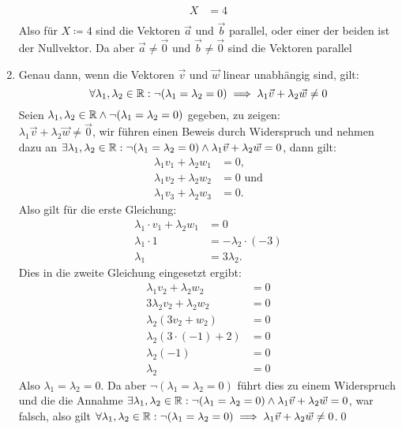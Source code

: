 \documentclass[sectionformat = aufgabe]{gadsescript}
\begin{document}
\begin{enumerate}[label=\alph*)]
\begin{align*}
			X &= 4\\
		\end{align*}
		Also für $ X \coloneqq 4 $ sind die Vektoren $\vec a $ und $ \vec b $ parallel, oder einer der beiden ist der Nullvektor. Da aber $ \vec a \neq \vec0 $ und $ \vec b \neq \vec0 $ sind die Vektoren parallel
	\item Genau dann, wenn die Vektoren $ \vec v $ und $ \vec w $ linear unabhängig sind, gilt:
		\[ \forall \lambda_1,\lambda_2 \in \mathbb{R} : \neg(\lambda_1 = \lambda_2 = 0 ) \implies \lambda_1\vec v + \lambda_2\vec w \neq 0 \]
		Seien $ \lambda_1, \lambda_2 \in \mathbb{R} \wedge \neg(\lambda_1 = \lambda_2 = 0)$ gegeben, zu zeigen:\\
		$\lambda_1 \vec v + \lambda_2 \vec w \neq \vec 0 $, wir führen einen Beweis durch Widerspruch und nehmen dazu an $ \exists\lambda_1,\lambda_2\in\mathbb{R}:\neg(\lambda_1=\lambda_2=0)\wedge\lambda_1\vec v+\lambda_2\vec w = 0$, dann gilt:
		\begin{align*}
			\lambda_1v_1 + \lambda_2w_1 &= 0,\\
			\lambda_1v_2 + \lambda_2w_2 &= 0 \text{ und}\\
			\lambda_1v_3 + \lambda_2w_3 &= 0.
		\end{align*}
		Also gilt für die erste Gleichung:
		\begin{align*}
			\lambda_1\cdot v_1 + \lambda_2w_1 &= 0\\
			\lambda_1 \cdot 1 &= -\lambda_2\cdot (-3)\\
			\lambda_1 &= 3\lambda_2.
		\end{align*}
		Dies in die zweite Gleichung eingesetzt ergibt:
		\begin{align*}
			\lambda_1v_2 + \lambda_2w_2 &= 0 \\
			3\lambda_2v_2 + \lambda_2w_2 &= 0 \\
			\lambda_2\left(3v_2 + w_2\right) &= 0 \\
			\lambda_2\left(3 \cdot (-1) + 2\right) &= 0 \\
			\lambda_2\left(-1\right) &= 0 \\
			\lambda_2 &= 0
		\end{align*}
		Also $ \lambda_1 = \lambda_2 = 0 $. Da aber $ \neg( \lambda_1 = \lambda_2 = 0) $ führt dies zu einem Widerspruch und die die Annahme $ \exists\lambda_1,\lambda_2\in\mathbb{R}:\neg(\lambda_1 = \lambda_2 = 0) \wedge \lambda_1\vec v+\lambda_2\vec w = 0$, war falsch, also gilt $\forall \lambda_1,\lambda_2 \in \mathbb{R} : \neg(\lambda_1 = \lambda_2 = 0) \implies \lambda_1\vec v + \lambda_2\vec w \neq 0 $.\qed
\end{enumerate}
\end{document}

